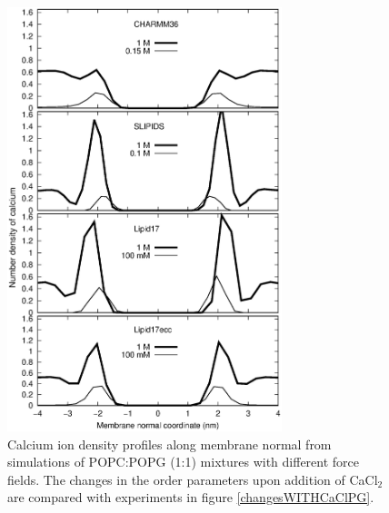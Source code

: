 \documentclass[journal=jpcbfk]{achemso}
\begin{document}
\begin{figure}[]
  \centering
  \includegraphics[width=8.0cm]{./Figs/CAdensPG1PC1.eps}
  \caption{\label{CAdensPG}
    Calcium ion density profiles along membrane normal from simulations of POPC:POPG (1:1) mixtures with different force fields.
    The changes in the order parameters upon addition of CaCl$_2$ are compared with experiments in figure \ref{changesWITHCaClPG}.
  }
\end{figure}
\end{document}
